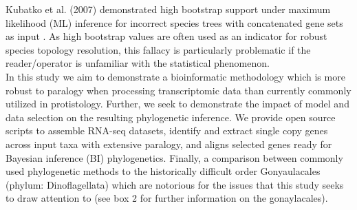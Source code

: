 \documentclass[12pt]{article}
\begin{document}
Kubatko et al. (2007) demonstrated high bootstrap support under maximum likelihood (ML) inference for incorrect species trees with concatenated gene sets as input \cite{kubatko2007inconsistency}. 
As high bootstrap values are often used as an indicator for robust species topology resolution, this fallacy is particularly problematic if the reader/operator is unfamiliar with the statistical phenomenon.\\
In this study we aim to demonstrate a bioinformatic methodology which is more robust to paralogy when processing transcriptomic data than currently commonly utilized in protistology. 
Further, we seek to demonstrate the impact of model and data selection on the resulting phylogenetic inference. 
We provide open source scripts to assemble RNA-seq datasets, identify and extract single copy genes across input taxa with extensive paralogy, and aligns selected genes ready for Bayesian inference (BI) phylogenetics. 
Finally, a comparison between commonly used phylogenetic methods to the historically difficult order Gonyaulacales (phylum: Dinoflagellata) which are notorious for the issues that this study seeks to draw attention to (see box 2 for further information on the gonaylacales).\\

\end{document}
